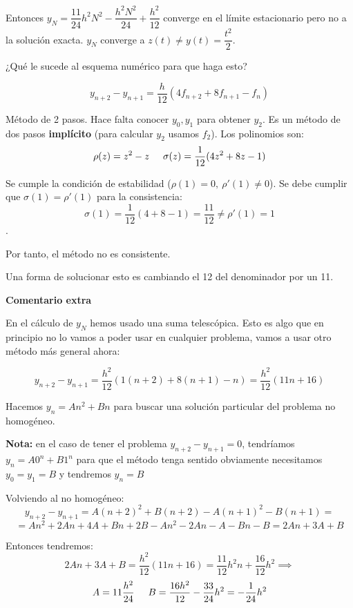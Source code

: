 \documentclass[openany]{book}
\begin{document}
\begin{exercise}
        Entonces $ y_{N} = \dfrac{11}{24}h^2N^2 - \dfrac{h^2N^2}{24}+\dfrac{h^2}{12} $ converge en el límite estacionario pero no a la solución exacta. $ y_N $ converge a $ z(t) \ne y(t) = \dfrac{t^2}{2} $.

        ¿Qué le sucede al esquema numérico para que haga esto?

        $$ y_{n+2}-y_{n+1} = \dfrac{h}{12}(4f_{n+2}+8f_{n+1}-f_n) $$

        Método de 2 pasos. Hace falta conocer $ y_0,y_1 $ para obtener $ y_2 $. Es un método de dos pasos \textbf{implícito} (para calcular $ y_2 $ usamos $ f_{2} $). Los polinomios son:
        $$ \rho(z) = z^2-z \hspace{5mm} \sigma(z) = \dfrac{1}{12}(4z^2+8z-1) $$

        Se cumple la condición de estabilidad ($ \rho(1)=0,\ \rho'(1) \ne 0 $). Se debe cumplir que $ \sigma(1) = \rho'(1) $ para la consistencia:
        $$ \sigma(1)=\dfrac{1}{12}(4+8-1) = \dfrac{11}{12} \ne \rho'(1) = 1 $$.
        
        Por tanto, el método no es consistente.

        Una forma de solucionar esto es cambiando el 12 del denominador por un 11.


        \begin{flushright}
            \textbf{Comentario extra}
        \end{flushright}

        En el cálculo de $ y_{N} $ hemos usado una suma telescópica. Esto es algo que en principio no lo vamos a poder usar en cualquier problema, vamos a usar otro método más general ahora:

        $$ y_{n+2}-y_{n+1} = \dfrac{h^2}{12}(1(n+2)+8(n+1)-n) = \dfrac{h^2}{12}(11n+16) $$

        Hacemos $ y_n = An^2+Bn $ para buscar una solución particular del problema no homogéneo.

        \textbf{Nota:} en el caso de tener el problema $ y_{n+2}-y_{n+1} = 0 $, tendríamos $ y_n = A 0^{n}+B 1^{n} $ para que el método tenga sentido obviamente necesitamos $ y_0=y_1=B $ y tendremos $ y_n = B $

        Volviendo al no homogéneo:
        $$ y_{n+2}-y_{n+1} = A(n+2)^2+B(n+2) - A(n+1)^2-B(n+1) =$$
        $$ =  An^2 + 2An +4A +Bn +2B - A n^2-2An-A-Bn-B= 2An +3A+B $$

        Entonces tendremos:
        $$ 2An+3A+B=\dfrac{h^2}{12}(11n+16) = \dfrac{11}{12}h^2n +\dfrac{16}{12}h^2 \implies $$
        $$ A = 11 \dfrac{h^2}{24}\hspace{5mm} B = \dfrac{16h^2}{12}-\dfrac{33}{24}h^2 = -\dfrac{1}{24}h^2 $$


\end{exercise}
\end{document}
